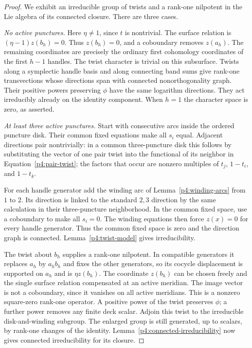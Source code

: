 \documentclass[11pt]{article}
\theoremstyle{plain}
\theoremstyle{definition}
\theoremstyle{remark}
\numberwithin{equation}{section}
\begin{document}
\begin{proof}
We exhibit an irreducible group of twists and a rank-one nilpotent in
the Lie algebra of its connected closure.  There are three cases.

\emph{No active punctures.}  Here $\eta\ne1$, since $t$ is nontrivial.
The surface relation is $(\eta-1)z(b_h)=0$.  Thus $z(b_h)=0$, and a
coboundary removes $z(a_h)$.  The remaining coordinates are precisely
the ordinary first cohomology coordinates of the first $h-1$ handles.
The twist character is trivial on this subsurface.  Twists along a
symplectic handle basis and along connecting band sums give rank-one
transvections whose directions span with connected nonorthogonality
graph.  Their positive powers preserving $\phi$ have the same
logarithm directions.  They act irreducibly already on the identity
component.  When $h=1$ the character space is zero, as asserted.

\emph{At least three active punctures.}  Start with consecutive arcs
inside the ordered puncture disk.  Their common fixed equations make
all $s_i$ equal.  Adjacent directions pair nontrivially: in a common
three-puncture disk this follows by substituting the vector of one
pair twist into the functional of its neighbor in
Equation~\eqref{p4:pair-twist}; the factors that occur are nonzero
multiples of $t_j$, $1-t_i$, and $1-t_k$.

For each handle generator add the winding arc of
Lemma~\ref{p4:winding-arcs} from $1$ to $2$.  Its direction is linked
to the standard $2,3$ direction by the same calculation in their
three-puncture neighborhood.  In the common fixed space, use a
coboundary to make all $s_i=0$.  The winding equations then force
$z(x)=0$ for every handle generator.  Thus the common fixed space is
zero and the direction graph is connected.  Lemma~\ref{p4:twist-model}
gives irreducibility.

The twist about $b_h$ supplies a rank-one nilpotent.  In compatible
generators it replaces $a_h$ by $a_hb_h$ and fixes the other generators,
so its cocycle displacement is supported on $a_h$ and is
$\eta z(b_h)$.  The coordinate $z(b_h)$ can be chosen freely and the
single surface relation compensated at an active meridian.  The image
vector is not a coboundary, since it vanishes on all active meridians.
This is a nonzero square-zero rank-one operator.  A positive power of
the twist preserves $\phi$; a further power removes any finite deck
scalar.  Adjoin this twist to the irreducible disk-and-winding subgroup.
The enlarged group is still generated, up to scalars, by rank-one
changes of the identity.  Lemma~\ref{p4:connected-irreducibility}
now gives connected irreducibility for its closure.


\end{proof}
\end{document}
